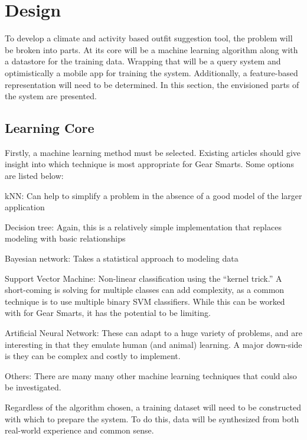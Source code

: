 \section{Design}
\label{section:design}
To develop a climate and activity based outfit suggestion tool, the problem will be broken into parts.
At its core will be a machine learning algorithm along with a datastore for the training data. Wrapping that will
be a query system and optimistically a mobile app for training the system. Additionally, a feature-based representation
will need to be determined. In this section, the envisioned parts of the system are presented.

\subsection{Learning Core}
Firstly, a machine learning method must be selected. Existing articles should give insight into which technique is
most appropriate for Gear Smarts. Some options are listed below:

\begin{description}
  \item{kNN:} Can help to simplify a problem in the absence of a good model of the larger application
  \item{Decision tree:} Again, this is a relatively simple implementation that replaces modeling with basic relationships
  \item{Bayesian network:} Takes a statistical approach to modeling data
  \item{Support Vector Machine:} Non-linear classification using the ``kernel trick.'' A short-coming is solving for multiple
  classes can add complexity, as a common technique is to use multiple binary SVM classifiers. While this can be worked with
  for Gear Smarts, it has the potential to be limiting.
  \item{Artificial Neural Network:} These can adapt to a huge variety of problems, and are interesting in that they emulate
  human (and animal) learning. A major down-side is they can be complex and costly to implement.
  \item{Others:} There are many many other machine learning techniques that could also be investigated.
\end{description}

Regardless of the algorithm chosen, a training dataset will need to be constructed with which to prepare the system. To do this,
data will be synthesized from both real-world experience and common sense.

